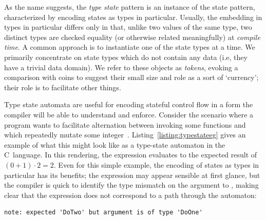 As the name suggests, the \textit{type state} pattern is an instance of the state pattern, characterized by encoding states as types in particular. Usually, the embedding in types in particular differs only in that, unlike two values of the same type, two distinct types are checked equality (or otherwise related meaningfully) at \textit{compile time}. A common approach is to instantiate one of the state types at a time. We primarily concentrate on state types which do not contain any data (i.e, they have a trivial data domain). We refer to these objects as \textit{tokens}, evoking a comparison with coins to suggest their small size and role as a sort of `currency'; their role is to facilitate other things.

Type state automata are useful for encoding stateful control flow in a form the compiler will be able to understand and enforce. Consider the scenario where a program wants to facilitate alternation between invoking some functions  and  which repeatedly mutate some integer~. Listing~\ref{listing:typestateeg} gives an example of what this might look like as a type-state automaton in the C~language. In this rendering, the expression  evaluates to the expected result of $(0 + 1) \cdot{} 2 = 2$. Even for this simple example, the encoding of states as types in particular has its benefits; the expression  may appear sensible at first glance, but the compiler is quick to identify the type mismatch on the argument to , making clear that the expression does not correspond to a path through the automaton:
\begin{verbatim}
note: expected 'DoTwo' but argument is of type 'DoOne'
\end{verbatim}

